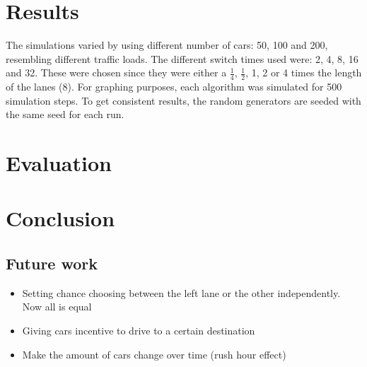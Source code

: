 \documentclass[a4paper,11pt]{article}
\begin{document}

\section{Results}\label{sec:results}
The simulations varied by using different number of cars: 50, 100 and 200,
resembling different traffic loads.
The different switch times used were: 2, 4, 8, 16 and 32.
These were chosen since they were either a $\frac{1}{4}$, $\frac{1}{2}$, 1, 2 or 4 times the length of the lanes (8).
For graphing purposes, each algorithm was simulated for 500 simulation steps.
To get consistent results, the random generators are seeded with the same seed for each run.




\section{Evaluation}\label{sec:eval}


\section{Conclusion}\label{sec:conclusion}


\subsection{Future work}

\begin{itemize}
 \item Setting chance choosing between the left lane or the other independently. Now all is equal %
 \item Giving cars incentive to drive to a certain destination
 \item Make the amount of cars change over time (rush hour effect)
\end{itemize}





\end{document}

